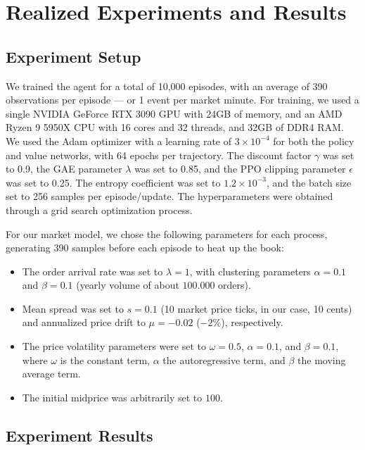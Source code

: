 \section{Realized Experiments and Results}
\label{sec:realized-experiments-and-results}

\subsection{Experiment Setup}
\label{subsec:experiment-setup}

We trained the agent for a total of 10,000 episodes, with an average of 390 observations per episode --- or 1 event per market minute.
For training, we used a single NVIDIA GeForce RTX 3090 GPU with 24GB of memory, and an AMD Ryzen 9 5950X CPU with 16 cores and 32 threads,
and 32GB of DDR4 RAM.
We used the Adam optimizer with a learning rate of $3 \times 10^{-4}$ for both the policy and value networks, with 64 epochs per trajectory.
The discount factor $\gamma$ was set to 0.9, the GAE parameter $\lambda$ was set to 0.85, and the PPO clipping parameter $\epsilon$ was set to 0.25.
The entropy coefficient was set to $1.2\times10^{-3}$, and the batch size set to 256 samples per episode/update.
The hyperparameters were obtained through a grid search optimization process.

For our market model, we chose the following parameters for each process, generating 390 samples before each episode to heat up the book:
\begin{itemize}
    \item The order arrival rate was set to $\lambda = 1$, with clustering parameters $\alpha = 0.1$ and $\beta = 0.1$ (yearly volume of about $100.000$ orders).
    \item Mean spread was set to $s = 0.1$ (10 market price ticks, in our case, 10 cents) and annualized price drift to $\mu = -0.02$ ($-2\%$), respectively.
    \item The price volatility parameters were set to $\omega = 0.5$, $\alpha = 0.1$, and $\beta = 0.1$,
    where $\omega$ is the constant term, $\alpha$ the autoregressive term, and $\beta$ the moving average term.
    \item The initial midprice was arbitrarily set to $100$.
\end{itemize}

\subsection{Experiment Results}
\label{subsec:experiment-results}

